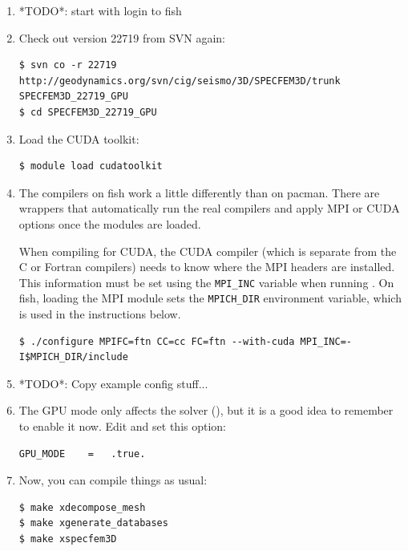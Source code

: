 \documentclass[10pt,fleqn,letterpaper]{article}
\begin{document}
\begin{enumerate}
\item *TODO*: start with login to fish

\item Check out version 22719 from SVN again:
\begin{lstlisting}
$ svn co -r 22719 http://geodynamics.org/svn/cig/seismo/3D/SPECFEM3D/trunk SPECFEM3D_22719_GPU
$ cd SPECFEM3D_22719_GPU
\end{lstlisting}

\item Load the CUDA toolkit:
\begin{lstlisting}
$ module load cudatoolkit
\end{lstlisting}

\item The compilers on fish work a little differently than on pacman. There are
      wrappers that automatically run the real compilers and apply MPI or CUDA
      options once the modules are loaded.

      When compiling for CUDA, the CUDA compiler (which is separate from the C
      or Fortran compilers) needs to know where the MPI headers are installed.
      This information must be set using the \texttt{MPI\_INC} variable when
      running . On fish, loading the MPI module sets the
      \texttt{MPICH\_DIR} environment variable, which is used in the instructions
      below.

\begin{lstlisting}
$ ./configure MPIFC=ftn CC=cc FC=ftn --with-cuda MPI_INC=-I$MPICH_DIR/include
\end{lstlisting}

\item *TODO*: Copy example config stuff...

\item The GPU mode only affects the solver (), but it is a good
      idea to remember to enable it now. Edit  and set this
      option:
\begin{lstlisting}
GPU_MODE    =   .true.
\end{lstlisting}

\item Now, you can compile things as usual:
\begin{lstlisting}
$ make xdecompose_mesh
$ make xgenerate_databases
$ make xspecfem3D
\end{lstlisting}


\end{enumerate}
\end{document}
